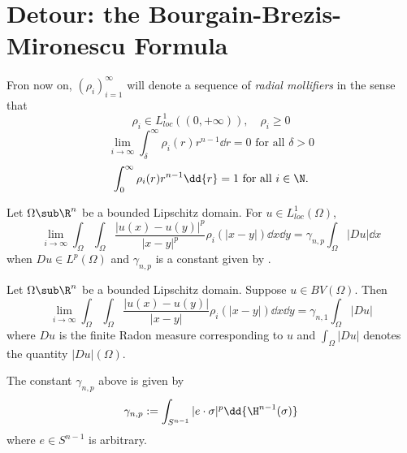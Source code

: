 \documentclass[../main.tex]{subfiles}
\begin{document}
\section{Detour: the Bourgain-Brezis-Mironescu Formula}

\begin{definition}
Fron now on, $ (\rho_{i})_{i=1}^{\infty} $ will denote a sequence of \textit{radial mollifiers} in the sense that 
\begin{equation}
    \rho_{i}\in L^{1}_{loc}((0,+\infty)),\quad \rho_{i}\geq 0
\end{equation}
\begin{equation}
    \lim_{i\to\infty}\int_{\delta}^{\infty} \rho_{i}(r)r^{n-1}\dd{r} = 0 \text{ for all } \delta>0 
\end{equation}
\begin{equation}
    \int_{0}^{\infty}\rho_{i}(r)r^{n-1}\dd{r} = 1 \text{ for all } i\in \N.
\end{equation}


\end{definition}

\begin{theorem}
    Let $ \Omega\sub \R^{n} $ be a bounded Lipschitz domain. For $ u\in L^{1}_{loc}(\Omega) $,
    \[
        \lim_{i\to\infty} \int_{\Omega}\int_{\Omega} \frac{|u(x)-u(y)|^{p}}{|x-y|^{p}} \rho_{i}(|x-y|)\dd{x} \dd{y} = \gamma_{n,p}\int_{\Omega}| Du| \dd{x}
    \]
    when $ Du\in L^{p}(\Omega) $ and $ \gamma_{n,p} $ is a constant given by . 
\end{theorem}

\begin{theorem}\label{bbmd}
    Let $ \Omega\sub \R^{n} $ be a bounded Lipschitz domain. Suppose $ u\in BV(\Omega) $. Then
    \[
        \lim_{i\to\infty} \int_{\Omega}\int_{\Omega} \frac{|u(x)-u(y)|}{|x-y|} \rho_{i}(|x-y|)\dd{x} \dd{y} = \gamma_{n,1}\int_{\Omega}| Du|
    \]
    where $ Du $ is the finite Radon measure corresponding to $ u $ and $ \int_{\Omega} |Du| $ denotes the quantity $ |Du |(\Omega) $.
\end{theorem}

The constant $ \gamma_{n,p} $ above is given by 
\[
    \gamma_{n,p}:= \int_{S^{n-1}} |e\cdot \sigma|^p \dd{\H^{n-1}(\sigma)}
\]
where $ e\in S^{n-1} $ is arbitrary.\\
\end{document}
